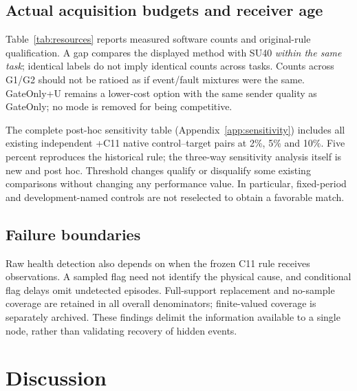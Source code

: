 \documentclass[10pt]{article}
\begin{document}
\subsection{Actual acquisition budgets and receiver age}
Table~\ref{tab:resources} reports measured software counts and original-rule qualification. A gap compares the displayed method with SU40 \emph{within the same task}; identical labels do not imply identical counts across tasks. Counts across G1/G2 should not be ratioed as if event/fault mixtures were the same. GateOnly+U remains a lower-cost option with the same sender quality as GateOnly; no mode is removed for being competitive.
\begin{table}[htbp]\centering
\caption{Native software resource counts, operationally attributed FI reports, pooled P95 source-data age and sample-gap qualification relative to each task's SU40. A ``yes'' marks $|g|\leq5\%$, not exact equal budgets. Fixed periods and all three independent budget controls are retained. Upload counts, mean bytes/upload and maximum age remain in the appendix/artifact.}
\label{tab:resources}
\end{table}

The complete post-hoc sensitivity table (Appendix~\ref{app:sensitivity}) includes all existing independent +C11 native control--target pairs at 2\%, 5\% and 10\%. Five percent reproduces the historical rule; the three-way sensitivity analysis itself is new and post hoc. Threshold changes qualify or disqualify some existing comparisons without changing any performance value. In particular, fixed-period and development-named controls are not reselected to obtain a favorable match.


\subsection{Failure boundaries}

Raw health detection also depends on when the frozen C11 rule receives observations. A sampled flag need not identify the physical cause, and conditional flag delays omit undetected episodes. Full-support replacement and no-sample coverage are retained in all overall denominators; finite-valued coverage is separately archived. These findings delimit the information available to a single node, rather than validating recovery of hidden events.

\section{Discussion}
\end{document}
